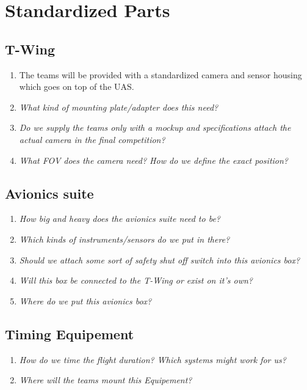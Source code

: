 \documentclass{article}
\begin{document}
\section{Standardized Parts}

\subsection{T-Wing}
\begin{enumerate}
  \item The teams will be provided with a standardized camera and sensor housing which goes on top of the UAS.
  \item \emph{What kind of mounting plate/adapter does this need?}
  \item \emph{Do we supply the teams only with a mockup and specifications attach the actual camera in the final competition?}
  \item \emph{What FOV does the camera need? How do we define the exact position?}
\end{enumerate}

\subsection{Avionics suite}
\begin{enumerate}
  \item \emph{How big and heavy does the avionics suite need to be?}
  \item \emph{Which kinds of instruments/sensors do we put in there?}
  \item \emph{Should we attach some sort of safety shut off switch into this avionics box?}
  \item \emph{Will this box be connected to the T-Wing or exist on it's own?}
  \item \emph{Where do we put this avionics box?}
\end{enumerate}

\subsection{Timing Equipement}
\begin{enumerate}
  \item \emph{How do we time the flight duration? Which systems might work for us?}
  \item \emph{Where will the teams mount this Equipement?}
\end{enumerate}
\end{document}
